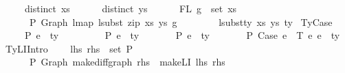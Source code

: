 \begin{isabellebody}
\ \ \ \ \ distinct\ xs\ {\isacharequal}{\kern0pt}{\isacharequal}{\kern0pt}{\isachargreater}{\kern0pt}\isanewline
\ \ \ \ \ distinct\ ys\ {\isacharequal}{\kern0pt}{\isacharequal}{\kern0pt}{\isachargreater}{\kern0pt}\isanewline
\ \ \ \ \ FL\ g\ {\isasymsubseteq}\ set\ xs\ {\isacharequal}{\kern0pt}{\isacharequal}{\kern0pt}{\isachargreater}{\kern0pt}\isanewline
\ \ \ \ \ {\isasymGamma}{}\ {\isasymturnstile}{\isacharbraceleft}{\kern0pt}P{\isacharbraceright}{\kern0pt}\ Graph\ {\isacharparenleft}{\kern0pt}lmap\ {\isacharparenleft}{\kern0pt}lsubst\ {\isacharparenleft}{\kern0pt}zip\ xs\ ys{\isacharparenright}{\kern0pt}{\isacharparenright}{\kern0pt}\ g{\isacharparenright}{\kern0pt}\isanewline
\ \ \ \ \ \ \ {\isacharcolon}{\kern0pt}\ lsubst{\isacharunderscore}{\kern0pt}ty\ xs\ ys\ ty{\isachardoublequoteclose}\isanewline
{\isacharbar}{\kern0pt}\ TyCase{\isacharcolon}{\kern0pt}\isanewline
\ \ \ \ {\isachardoublequoteopen}{\isasymGamma}\ {\isasymturnstile}{\isacharbraceleft}{\kern0pt}P{\isacharbraceright}{\kern0pt}\ e{}\ {\isacharcolon}{\kern0pt}\ ty{}\ {\isacharequal}{\kern0pt}{\isacharequal}{\kern0pt}{\isachargreater}{\kern0pt}\isanewline
\ \ \ \ \ {\isasymGamma}{}\ {\isacharat}{\kern0pt}\ {\isasymGamma}\ {\isasymturnstile}{\isacharbraceleft}{\kern0pt}P{\isacharbraceright}{\kern0pt}\ e{}\ {\isacharcolon}{\kern0pt}\ ty{}\ {\isacharequal}{\kern0pt}{\isacharequal}{\kern0pt}{\isachargreater}{\kern0pt}\isanewline
\ \ \ \ \ {\isasymGamma}\ {\isasymturnstile}{\isacharbraceleft}{\kern0pt}P{\isacharbraceright}{\kern0pt}\ e{}\ {\isacharcolon}{\kern0pt}\ ty{}\ {\isacharequal}{\kern0pt}{\isacharequal}{\kern0pt}{\isachargreater}{\kern0pt}\isanewline
\ \ \ \ \ {\isasymGamma}\ {\isasymturnstile}{\isacharbraceleft}{\kern0pt}P{\isacharbraceright}{\kern0pt}\ Case\ e{}\ {\isasymGamma}{}\ T\ e{}\ e{}\ {\isacharcolon}{\kern0pt}\ ty{}{\isachardoublequoteclose}\isanewline
{\isacharbar}{\kern0pt}\ TyLIIntro{\isacharcolon}{\kern0pt}\isanewline
\ \ \ \ {\isachardoublequoteopen}{\isacharparenleft}{\kern0pt}lhs{\isacharcomma}{\kern0pt}\ rhs{\isacharparenright}{\kern0pt}\ {\isasymin}\ set\ P\ {\isacharequal}{\kern0pt}{\isacharequal}{\kern0pt}{\isachargreater}{\kern0pt}\isanewline
\ \ \ \ \ {\isasymGamma}\ {\isasymturnstile}{\isacharbraceleft}{\kern0pt}P{\isacharbraceright}{\kern0pt}\ Graph\ {\isacharparenleft}{\kern0pt}make{\isacharunderscore}{\kern0pt}diffgraph\ rhs{\isacharparenright}{\kern0pt}\ {\isacharcolon}{\kern0pt}\ make{\isacharunderscore}{\kern0pt}LI\ {\isacharparenleft}{\kern0pt}lhs{\isacharcomma}{\kern0pt}\ rhs{\isacharparenright}{\kern0pt}{\isachardoublequoteclose}\isanewline

\end{isabellebody}
